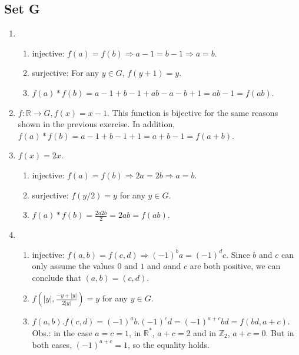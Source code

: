 \subsection{Set G}
\begin{enumerate}
    \item 
        \begin{enumerate}
            \item injective: $ f(a) = f(b) \Rightarrow a - 1 = b - 1 \Rightarrow a = b $.

            \item surjective: For any $ y \in G $, $ f(y + 1) = y $.

            \item $ f(a) * f(b) = a - 1 + b - 1 + ab - a - b + 1 = ab -1 = f(ab) $.
        \end{enumerate}

    \item $ f: \mathbb{R} \to G, f(x) = x - 1 $. This function is bijective for the same reasons shown in the previous exercise. In addition, $ f(a) * f(b) = a - 1 + b - 1 + 1 = a + b - 1 = f(a + b) $.

    \item $ f(x) = 2x $.
        \begin{enumerate}
            \item injective: $ f(a) = f(b) \Rightarrow 2a = 2b \Rightarrow a = b $.

            \item surjective: $ f(y/2) = y$ for any $ y \in G $.

            \item $ f(a) * f(b) = \frac{2a2b}{2} = 2ab = f(ab) $.
        \end{enumerate}

    \item
        \begin{enumerate}
            \item injective: $ f(a, b) = f(c, d) \Rightarrow (-1)^ba = (-1)^dc $. Since $ b $ and $ c $ can only assume the values $ 0 $ and $ 1 $ and $ a $and $ c $ are both positive, we can conclude that $ (a, b) = (c, d) $.

            \item $ f\left(|y|, \frac{-y + |y|}{2|y|} \right) = y $ for any $y \in G$.

            \item $ f(a, b).f(c, d) = (-1)^ab.(-1)^cd = (-1)^{a + c}bd = f(bd, a + c) $. Obs.: in the case $  a = c = 1 $, in $ \mathbb{R}^* $, $ a + c = 2 $ and in $ \mathbb{Z}_2 $, $ a + c = 0 $. But in both cases, $ (-1)^{a + c} = 1 $, so the equality holds.
        \end{enumerate}
\end{enumerate}

